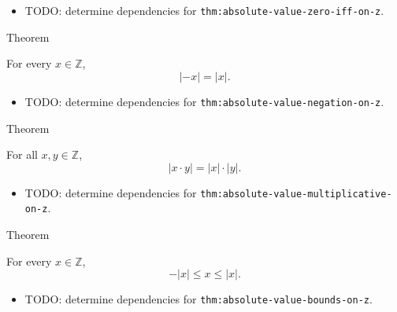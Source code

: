 \begin{dependencies}
\begin{itemize}
  \item TODO: determine dependencies for \texttt{thm:absolute-value-zero-iff-on-z}.
\end{itemize}
\end{dependencies}

\begin{theorembox}{Theorem}
\begin{theorem}
\label{thm:absolute-value-negation-on-z}
For every $x\in\mathbb{Z}$,
\[
|-x|=|x|.
\]
\end{theorem}
\end{theorembox}

\begin{dependencies}
\begin{itemize}
  \item TODO: determine dependencies for \texttt{thm:absolute-value-negation-on-z}.
\end{itemize}
\end{dependencies}

\begin{theorembox}{Theorem}
\begin{theorem}
\label{thm:absolute-value-multiplicative-on-z}
For all $x,y\in\mathbb{Z}$,
\[
|x\cdot y|=|x|\cdot |y|.
\]
\end{theorem}
\end{theorembox}

\begin{dependencies}
\begin{itemize}
  \item TODO: determine dependencies for \texttt{thm:absolute-value-multiplicative-on-z}.
\end{itemize}
\end{dependencies}

\begin{theorembox}{Theorem}
\begin{theorem}
\label{thm:absolute-value-bounds-on-z}
For every $x\in\mathbb{Z}$,
\[
-|x|\le x\le |x|.
\]
\end{theorem}
\end{theorembox}

\begin{dependencies}
\begin{itemize}
  \item TODO: determine dependencies for \texttt{thm:absolute-value-bounds-on-z}.
\end{itemize}
\end{dependencies}

